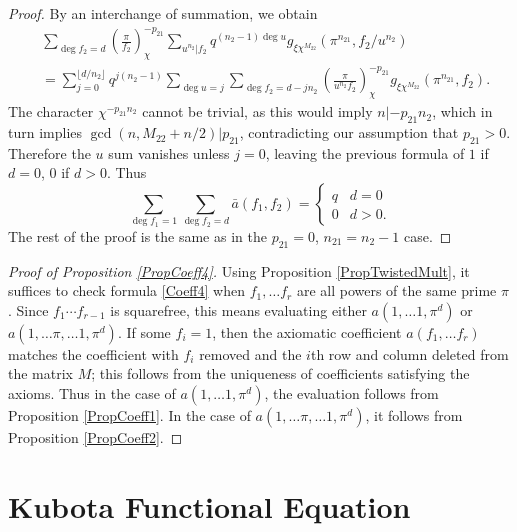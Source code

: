 \documentclass[11pt,letterpaper]{article}
\theoremstyle{definition}
\theoremstyle{remark}
\numberwithin{equation}{section}
\theoremstyle{dotless}
\newcommand{\res}[2]{\left(\frac{#1}{#2}\right)}
\begin{document}
\begin{proof}
By an interchange of summation, we obtain
\begin{equation*}
\begin{split}
&\sum_{\deg f_2 = d} \res{\pi}{f_2}_{\chi}^{-p_{21}} \sum_{u^{n_2}|f_2} q^{(n_2-1)\deg u} g_{\xi \chi^{M_{22}}}(\pi^{n_{21}}, f_2/u^{n_2}) \\
&= \sum_{j=0}^{\lfloor d/n_2 \rfloor} q^{j(n_2-1)} \sum_{\deg u = j}  \sum_{\deg f_2 = d-jn_2} \res{\pi}{u^{n_2}f_2}_{\chi}^{-p_{21}} g_{\xi \chi^{M_{22}}}(\pi^{n_{21}}, f_2).
\end{split}
\end{equation*}
The character $\chi^{-p_{21}n_2}$ cannot be trivial, as this would imply $n| -p_{21}n_2$, which in turn implies $\gcd(n, M_{22}+n/2) | p_{21}$, contradicting our assumption that $p_{21}>0$. Therefore the $u$ sum vanishes unless $j=0$, leaving the previous formula of $1$ if $d=0$, $0$ if $d>0$. Thus
\begin{equation*}
\sum_{\deg f_1 = 1} \sum_{\deg f_2=d} \bar{a}(f_1, f_2)=\left\lbrace \begin{array}{cc} q & d=0 \\ 0 & d>0 .\end{array} \right.
\end{equation*}
The rest of the proof is the same as in the $p_{21}=0$, $n_{21}=n_2-1$ case.

\end{proof}

\begin{proof}[Proof of Proposition \ref{PropCoeff4}]
Using Proposition \ref{PropTwistedMult}, it suffices to check formula \eqref{Coeff4} when $f_1, \ldots f_r$ are all powers of the same prime $\pi$. Since $f_1\cdots f_{r-1}$ is squarefree, this means evaluating either $a(1, \ldots 1, \pi^d)$ or $a(1, \ldots \pi, \ldots 1, \pi^d)$. If some $f_i=1$, then the axiomatic coefficient $a(f_1, \ldots f_r)$ matches the coefficient with $f_i$ removed and the $i$th row and column deleted from the matrix $M$; this follows from the uniqueness of coefficients satisfying the axioms. Thus in the case of  $a(1, \ldots 1, \pi^d)$, the evaluation follows from Proposition \ref{PropCoeff1}. In the case of $a(1, \ldots \pi, \ldots 1, \pi^d)$, it follows from Proposition \ref{PropCoeff2}. 
\end{proof}

\section{Kubota Functional Equation} \label{SectionKubota}
\end{document}
